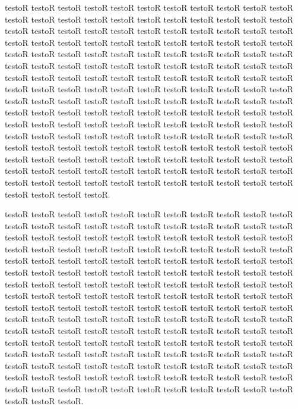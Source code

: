 \documentclass[11pt,a4paper]{book}
\begin{document}
\begin{pages}
\begin{Rightside}
\beginnumbering
\pstart {} testoR testoR testoR testoR testoR testoR testoR testoR testoR testoR testoR testoR testoR testoR testoR testoR testoR testoR testoR testoR testoR testoR testoR testoR testoR testoR testoR testoR testoR testoR testoR testoR testoR testoR testoR testoR testoR testoR testoR testoR testoR testoR testoR testoR testoR testoR testoR testoR testoR testoR testoR testoR testoR testoR testoR testoR testoR testoR testoR testoR testoR testoR testoR testoR testoR testoR testoR testoR testoR testoR testoR testoR testoR testoR testoR testoR testoR testoR testoR testoR testoR testoR testoR testoR testoR testoR testoR testoR testoR testoR testoR testoR testoR testoR testoR testoR testoR testoR testoR testoR testoR testoR testoR testoR testoR testoR testoR testoR testoR testoR testoR testoR testoR testoR testoR testoR testoR testoR testoR testoR testoR testoR testoR testoR testoR testoR testoR testoR testoR testoR testoR testoR testoR testoR testoR testoR testoR testoR testoR testoR testoR testoR testoR testoR testoR testoR testoR testoR testoR testoR testoR testoR testoR testoR testoR testoR testoR testoR testoR testoR testoR testoR testoR testoR testoR testoR testoR testoR testoR testoR testoR testoR testoR testoR testoR testoR testoR testoR testoR testoR.\pend

\pstart testoR testoR testoR testoR testoR testoR testoR testoR testoR testoR testoR testoR testoR testoR testoR testoR testoR testoR testoR testoR testoR testoR testoR testoR testoR testoR testoR testoR testoR testoR testoR testoR testoR testoR testoR testoR testoR testoR testoR testoR testoR testoR testoR testoR testoR testoR testoR testoR testoR testoR testoR testoR testoR testoR testoR testoR testoR testoR testoR testoR testoR testoR testoR testoR testoR testoR testoR testoR testoR testoR testoR testoR testoR testoR testoR testoR testoR testoR testoR testoR testoR testoR testoR testoR testoR testoR testoR testoR testoR testoR testoR testoR testoR testoR testoR testoR testoR testoR testoR testoR testoR testoR testoR testoR testoR testoR testoR testoR testoR testoR testoR testoR testoR testoR testoR testoR testoR testoR testoR testoR testoR testoR testoR testoR testoR testoR testoR testoR testoR testoR testoR testoR testoR testoR testoR testoR testoR testoR testoR testoR testoR testoR testoR testoR testoR testoR testoR testoR testoR testoR testoR testoR testoR testoR testoR testoR testoR testoR testoR testoR testoR testoR testoR testoR testoR testoR testoR testoR testoR testoR testoR testoR testoR testoR testoR testoR testoR testoR testoR.\pend


\end{Rightside}
\end{pages}
\end{document}
